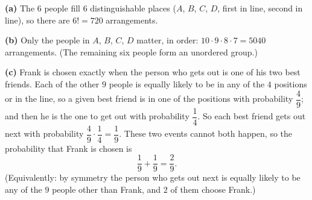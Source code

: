 \textbf{(a)} The $6$ people fill $6$ distinguishable places ($A$, $B$, $C$, $D$, first in line, second in line), so there are $6!=\boxed{720}$ arrangements.

\textbf{(b)} Only the people in $A$, $B$, $C$, $D$ matter, in order: $10\cdot9\cdot8\cdot7=\boxed{5040}$ arrangements. (The remaining six people form an unordered group.)

\textbf{(c)} Frank is chosen exactly when the person who gets out is one of his two best friends. Each of the other $9$ people is equally likely to be in any of the $4$ positions or in the line, so a given best friend is in one of the positions with probability $\dfrac{4}{9}$; and then he is the one to get out with probability $\dfrac{1}{4}$. So each best friend gets out next with probability $\dfrac{4}{9}\cdot\dfrac{1}{4}=\dfrac{1}{9}$. These two events cannot both happen, so the probability that Frank is chosen is
\[\dfrac{1}{9}+\dfrac{1}{9}=\boxed{\dfrac{2}{9}}.\]
(Equivalently: by symmetry the person who gets out next is equally likely to be any of the $9$ people other than Frank, and $2$ of them choose Frank.)
